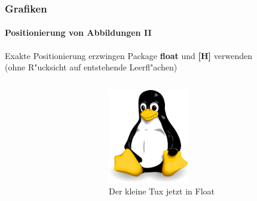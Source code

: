 
\begin{frame}[t]
\medskip
\frametitle{Grafiken}
\framesubtitle{Positionierung von Abbildungen II }
\begin{block}{Exakte Positionierung erzwingen}
Package {\ttfamily \textbf{float}} und \textbf{[H]} verwenden\\
(ohne R"ucksicht auf entstehende Leerfl"achen)
\end{block}

\begin{columns}
\begin{column}{.5\textwidth}
{\ttfamily {\footnotesize
}}
\end{column}

\begin{column}{.5\textwidth} 
\begin{figure}
\begin{center}
    \includegraphics[width=35mm]{image/tux.png}
\caption{Der kleine Tux jetzt in Float}
\label{img:kleinertux_float}
\end{center}
\end{figure}
\end{column}
\end{columns}

\end{frame}
